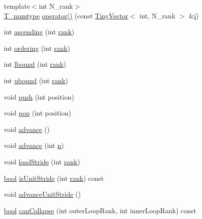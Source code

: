 \begin{DoxyCompactItemize}
\item 
{\footnotesize template$<$int N\+\_\+rank$>$ }\\\hyperlink{class__bz__FunctorExpr3_ad90a6f210859e4b689cd783be74ee748}{T\+\_\+numtype} \hyperlink{class__bz__FunctorExpr3_a9e7ce78eb5c8995bb946852663a3bb71}{operator()} (const \hyperlink{classTinyVector}{Tiny\+Vector}$<$ int, N\+\_\+rank $>$ \&\hyperlink{indexexpr_8h_aabd77643995707c185e95c8cb2782c81}{i})
\item 
int \hyperlink{class__bz__FunctorExpr3_ab99354e2b7bfcc0e28dad171badd9d9b}{ascending} (int \hyperlink{zfftnd_8c_a6cfd95afd0afebd625b889fb6e58371c}{rank})
\item 
int \hyperlink{class__bz__FunctorExpr3_a8bd472e8d3a1b81af83d37f6988e1fe4}{ordering} (int \hyperlink{zfftnd_8c_a6cfd95afd0afebd625b889fb6e58371c}{rank})
\item 
int \hyperlink{class__bz__FunctorExpr3_aec3a9465802aa0d5373c86a40770b044}{lbound} (int \hyperlink{zfftnd_8c_a6cfd95afd0afebd625b889fb6e58371c}{rank})
\item 
int \hyperlink{class__bz__FunctorExpr3_af1aad653783e38d501540e2ea862a92b}{ubound} (int \hyperlink{zfftnd_8c_a6cfd95afd0afebd625b889fb6e58371c}{rank})
\item 
void \hyperlink{class__bz__FunctorExpr3_aaf760a69c19bf985d9dd4024dd60171e}{push} (int position)
\item 
void \hyperlink{class__bz__FunctorExpr3_a2231d7f0263fcc1c84f122babaac7f6e}{pop} (int position)
\item 
void \hyperlink{class__bz__FunctorExpr3_a8b9e6a511d26070c5a3beeaffc61660e}{advance} ()
\item 
void \hyperlink{class__bz__FunctorExpr3_aa2b082e57e865a8ec2375b6c8d82099c}{advance} (int \hyperlink{indexexpr_8h_ab427e2e2b4d6cec55fa088ea2a692ace}{n})
\item 
void \hyperlink{class__bz__FunctorExpr3_a59d01fe684afe0a705ddc1a2d20c60a6}{load\+Stride} (int \hyperlink{zfftnd_8c_a6cfd95afd0afebd625b889fb6e58371c}{rank})
\item 
\hyperlink{compiler_8h_abb452686968e48b67397da5f97445f5b}{bool} \hyperlink{class__bz__FunctorExpr3_afbf9f2b07dbfaa0e8bf9f4a1d108e940}{is\+Unit\+Stride} (int \hyperlink{zfftnd_8c_a6cfd95afd0afebd625b889fb6e58371c}{rank}) const 
\item 
void \hyperlink{class__bz__FunctorExpr3_ac994339dfefd83947d15632c2a3e7351}{advance\+Unit\+Stride} ()
\item 
\hyperlink{compiler_8h_abb452686968e48b67397da5f97445f5b}{bool} \hyperlink{class__bz__FunctorExpr3_a26a82b25f23b157519ca934a4b7da11b}{can\+Collapse} (int outer\+Loop\+Rank, int inner\+Loop\+Rank) const 

\end{DoxyCompactItemize}
